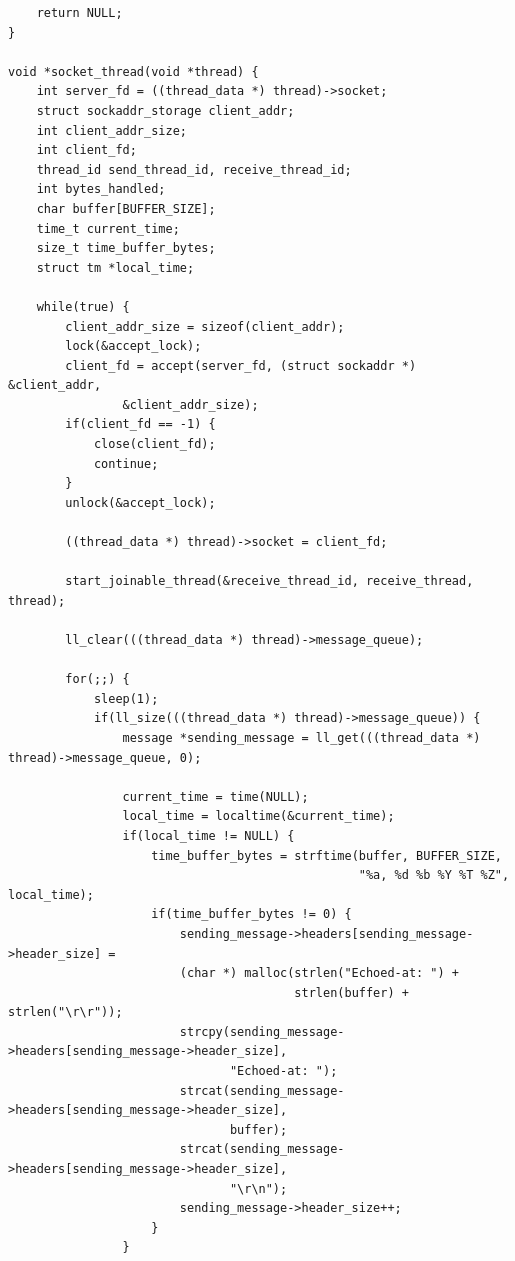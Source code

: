 \documentclass{article}
\begin{document}
\begin{verbatim}
    return NULL;
}

void *socket_thread(void *thread) {
    int server_fd = ((thread_data *) thread)->socket;
    struct sockaddr_storage client_addr;
    int client_addr_size;
    int client_fd;
    thread_id send_thread_id, receive_thread_id;
    int bytes_handled;
    char buffer[BUFFER_SIZE];
    time_t current_time;
    size_t time_buffer_bytes;
    struct tm *local_time;
    
    while(true) {
        client_addr_size = sizeof(client_addr);
        lock(&accept_lock);
        client_fd = accept(server_fd, (struct sockaddr *) &client_addr,
                &client_addr_size);
        if(client_fd == -1) {
            close(client_fd);
            continue;
        }
        unlock(&accept_lock);

        ((thread_data *) thread)->socket = client_fd;
        
        start_joinable_thread(&receive_thread_id, receive_thread, thread);
        
        ll_clear(((thread_data *) thread)->message_queue);
        
        for(;;) {
            sleep(1);
            if(ll_size(((thread_data *) thread)->message_queue)) {
                message *sending_message = ll_get(((thread_data *) thread)->message_queue, 0);
                
                current_time = time(NULL);
                local_time = localtime(&current_time);
                if(local_time != NULL) {
                    time_buffer_bytes = strftime(buffer, BUFFER_SIZE,
                                                 "%a, %d %b %Y %T %Z", local_time);
                    if(time_buffer_bytes != 0) {
                        sending_message->headers[sending_message->header_size] =
                        (char *) malloc(strlen("Echoed-at: ") +
                                        strlen(buffer) + strlen("\r\r"));
                        strcpy(sending_message->headers[sending_message->header_size],
                               "Echoed-at: ");
                        strcat(sending_message->headers[sending_message->header_size],
                               buffer);
                        strcat(sending_message->headers[sending_message->header_size],
                               "\r\n");
                        sending_message->header_size++;
                    }
                }
                

\end{verbatim}
\end{document}
